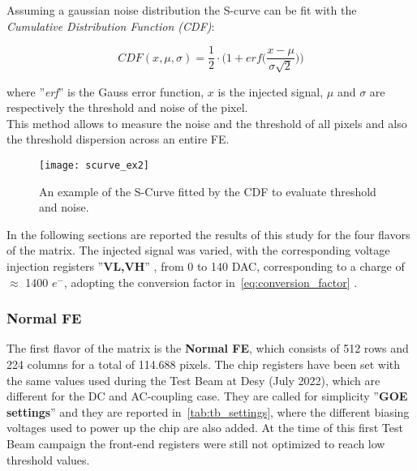 Assuming a gaussian noise distribution the S-curve can be fit with the \textit{Cumulative Distribution Function (CDF)}:

\begin{equation}
 CDF(x,\mu,\sigma) = \frac{1}{2} \cdot \bigg(1 + \textit{erf}\bigg(\frac{x-\mu}{\sigma \sqrt{2}}\bigg)\bigg)
\label{eq:s-curve}
\end{equation}

where ''\textit{erf}'' is the Gauss error function, $x$ is the injected signal, $\mu$ and $\sigma$ are respectively the threshold and noise of the pixel.  \\

This method allows to measure the noise and the threshold of all pixels and also the threshold dispersion across an entire FE.

\begin{figure}
\centering
\texttt{[image: scurve\_ex2]}
\caption{An example of the S-Curve fitted by the CDF to evaluate threshold and noise.}
\label{fig:ex_scurve}
\end{figure}

In the following sections are reported the results of this study for the four flavors of the matrix. The injected signal was varied, with the corresponding voltage injection registers ''\textbf{VL,VH}'' , from 0 to 140 DAC, corresponding to a charge of $\approx$ 1400 $e^{-}$, adopting the conversion factor in~\autoref{eq:conversion_factor} .


\subsubsection{Normal FE}

The first flavor of the matrix is the \textbf{Normal FE}, which consists of 512 rows and 224 columns for a total of 114.688 pixels. The chip registers have been set with the same values used during the Test Beam at Desy (July 2022), which are different for the DC and AC-coupling case. They are called for simplicity ''\textbf{GOE settings}'' and they are reported in~\autoref{tab:tb_settings}, where the different biasing voltages used to power up the chip are also added. At the time of this first Test Beam campaign the front-end registers were still not  optimized to reach low threshold values. 

